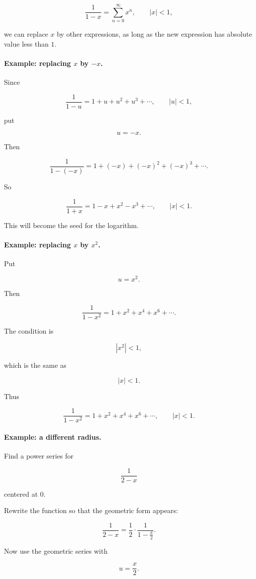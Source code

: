 \[
\frac1{1-x}=\sum_{n=0}^{\infty}x^n,
\qquad |x|<1,
\]

we can replace \(x\) by other expressions, as long as the new expression has absolute
value less than \(1\).

\paragraph{Example: replacing \(x\) by \(-x\).}
Since

\[
\frac1{1-u}=1+u+u^2+u^3+\cdots,
\qquad |u|<1,
\]

put

\[
u=-x.
\]

Then

\[
\frac1{1-(-x)}
=
1+(-x)+(-x)^2+(-x)^3+\cdots.
\]

So

\[
\boxed{
\frac1{1+x}
=
1-x+x^2-x^3+\cdots,
\qquad |x|<1.
}
\]

This will become the seed for the logarithm.

\paragraph{Example: replacing \(x\) by \(x^2\).}
Put

\[
u=x^2.
\]

Then

\[
\frac1{1-x^2}
=
1+x^2+x^4+x^6+\cdots.
\]

The condition is

\[
|x^2|<1,
\]

which is the same as

\[
|x|<1.
\]

Thus

\[
\boxed{
\frac1{1-x^2}
=
1+x^2+x^4+x^6+\cdots,
\qquad |x|<1.
}
\]

\paragraph{Example: a different radius.}
Find a power series for

\[
\frac1{2-x}
\]

centered at \(0\).

Rewrite the function so that the geometric form appears:

\[
\frac1{2-x}
=
\frac12\cdot \frac1{1-\frac{x}{2}}.
\]

Now use the geometric series with

\[
u=\frac{x}{2}.
\]


